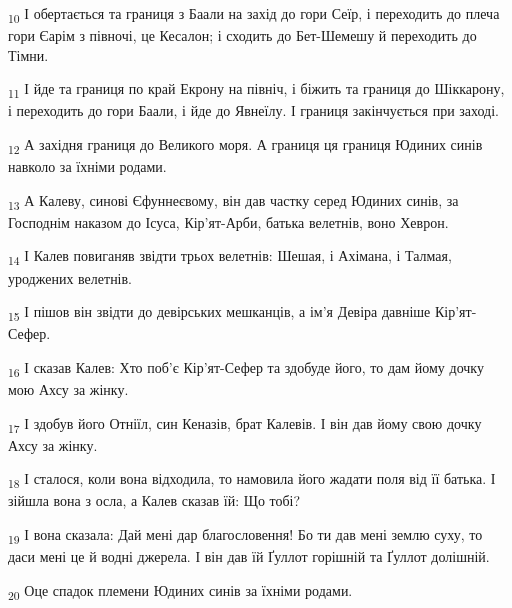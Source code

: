 \begin{tcolorbox}
\textsubscript{10} І обертається та границя з Баали на захід до гори Сеїр, і переходить до плеча гори Єарім з півночі, це Кесалон; і сходить до Бет-Шемешу й переходить до Тімни.
\end{tcolorbox}
\begin{tcolorbox}
\textsubscript{11} І йде та границя по край Екрону на північ, і біжить та границя до Шіккарону, і переходить до гори Баали, і йде до Явнеїлу. І границя закінчується при заході.
\end{tcolorbox}
\begin{tcolorbox}
\textsubscript{12} А західня границя до Великого моря. А границя ця границя Юдиних синів навколо за їхніми родами.
\end{tcolorbox}
\begin{tcolorbox}
\textsubscript{13} А Калеву, синові Єфуннеєвому, він дав частку серед Юдиних синів, за Господнім наказом до Ісуса, Кір'ят-Арби, батька велетнів, воно Хеврон.
\end{tcolorbox}
\begin{tcolorbox}
\textsubscript{14} І Калев повиганяв звідти трьох велетнів: Шешая, і Ахімана, і Талмая, уроджених велетнів.
\end{tcolorbox}
\begin{tcolorbox}
\textsubscript{15} І пішов він звідти до девірських мешканців, а ім'я Девіра давніше Кір'ят-Сефер.
\end{tcolorbox}
\begin{tcolorbox}
\textsubscript{16} І сказав Калев: Хто поб'є Кір'ят-Сефер та здобуде його, то дам йому дочку мою Ахсу за жінку.
\end{tcolorbox}
\begin{tcolorbox}
\textsubscript{17} І здобув його Отніїл, син Кеназів, брат Калевів. І він дав йому свою дочку Ахсу за жінку.
\end{tcolorbox}
\begin{tcolorbox}
\textsubscript{18} І сталося, коли вона відходила, то намовила його жадати поля від її батька. І зійшла вона з осла, а Калев сказав їй: Що тобі?
\end{tcolorbox}
\begin{tcolorbox}
\textsubscript{19} І вона сказала: Дай мені дар благословення! Бо ти дав мені землю суху, то даси мені це й водні джерела. І він дав їй Ґуллот горішній та Ґуллот долішній.
\end{tcolorbox}
\begin{tcolorbox}
\textsubscript{20} Оце спадок племени Юдиних синів за їхніми родами.
\end{tcolorbox}
